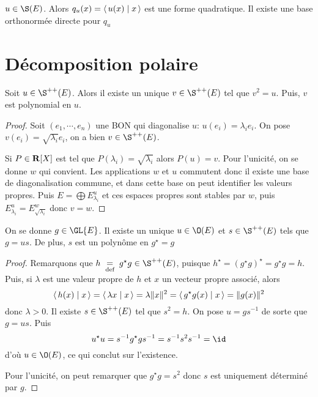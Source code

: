 \begin{cor}
    $u \in  \S(E)$. Alors $q_u(x)= \scalar{u(x)}{x} $ est une forme quadratique. Il existe une base orthonormée directe pour $q_u$
\end{cor}


\section{Décomposition polaire}

\begin{prop}
    Soit $u \in  \S^{++}(E)$. Alors il existe un unique $v \in  \S ^{++}(E)$ tel que $v^2 =u$. Puis, $v$ est polynomial en  $u$.
\end{prop}

\begin{proof}
    Soit $(e_1, \cdots , e_n)$ une BON qui diagonalise $u$:  $ u(e_i)=\lambda_i e_i$. On pose $v(e_i)=\sqrt{\lambda_i}e_i$, on a bien  $v \in  \S ^{++}(E)$.

    Si $P \in  \mathbf R[X]$ est tel que $P(\lambda_i)=\sqrt{\lambda_i}$ alors  $P(u)=v$. Pour l'unicité, on se donne  $w$ qui convient. Les applications  $w$ et  $u$ commutent donc il existe une base de diagonalisation commune, et dans cette base on peut identifier les valeurs propres. Puis  $E=\bigoplus E_{\lambda_i}^u$ et  ces espaces propres sont stables par  $w$, puis  $E_{\lambda_i}^u=E_{\sqrt{\lambda_i}}^w$ donc  $v=w$.
\end{proof}

\begin{thm}
    On se donne $g \in  \GL{E}$. Il existe un unique $u \in  \O(E)$ et $s \in  \S ^{++}(E)$ tels que $g=us$. De plus,  $s$ est un polynôme en  $g^\star=g$
\end{thm}

\begin{proof}
    Remarquons que $h\defeq g^\star g \in  \S ^{++}(E)$, puisque $h^\star=(g^\star g)^\star=g^\star g=h$. Puis, si  $\lambda$ est une valeur propre de  $h$ et  $x$ un vecteur propre associé, alors  \[
        \scalar{h(x)}{x} = \scalar{\lambda x}{x} = \lambda \|x\|^2 = \scalar{g^\star g (x)}{x} = \|g(x)\|^2 
    \] 
    donc $ \lambda >0$. Il existe $s \in \S^{ ++ }(E)$ tel que $s^2 =h$. On pose $u=gs^{-1}$ de sorte que $g=us$. Puis  \[
    u^\star u=s^{-1}g^\star g s^{-1}=s ^{-1} s^2 s ^{-1}=\id
    \] 
    d'où $u \in  \O(E)$, ce qui conclut sur l'existence.

    Pour l'unicité, on peut remarquer que $g^\star g=s^2$ donc  $s$ est uniquement déterminé par  $g$.
\end{proof}
